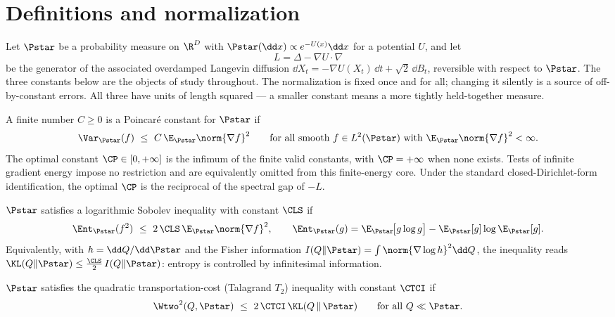 \documentclass[../main.tex]{subfiles}
\begin{document}
\section{Definitions and normalization}
\label{sec:def}

Let $\Pstar$ be a probability measure on $\R^D$ with $\Pstar(\dd x)\propto e^{-U(x)}\dd x$
for a potential $U$, and let
\[
  L=\Delta-\nabla U\cdot\nabla
\]
be the generator of the associated overdamped Langevin diffusion
$\dd X_t=-\nabla U(X_t)\,\dd t+\sqrt2\,\dd B_t$, reversible with respect to $\Pstar$. The
three constants below are the objects of study throughout. The normalization is fixed once
and for all; changing it silently is a source of off-by-constant errors. All three have
units of length squared --- a smaller constant means a more tightly held-together measure.

\begin{definition}
\label{def:poincare}
A finite number $C\ge0$ is a Poincar\'e constant for $\Pstar$ if
\begin{equation}\label{eq:poincare}
  \Var_{\Pstar}(f)\ \le\ C\,\E_{\Pstar}\norm{\nabla f}^2
  \qquad\text{for all smooth } f\in L^2(\Pstar)
  \text{ with }\E_{\Pstar}\norm{\nabla f}^2<\infty.
\end{equation}
The optimal constant $\CP\in[0,+\infty]$ is the infimum of the finite valid constants, with
$\CP=+\infty$ when none exists. Tests of infinite gradient energy impose no restriction and are
equivalently omitted from this finite-energy core. Under the standard closed-Dirichlet-form
identification, the optimal $\CP$ is the reciprocal of the spectral gap of $-L$.
\end{definition}

\begin{definition}
\label{def:lsi}
$\Pstar$ satisfies a logarithmic Sobolev inequality with constant $\CLS$ if
\begin{equation}\label{eq:lsi}
  \Ent_{\Pstar}(f^2)\ \le\ 2\,\CLS\,\E_{\Pstar}\norm{\nabla f}^2 ,
  \qquad
  \Ent_{\Pstar}(g)=\E_{\Pstar}\!\big[g\log g\big]-\E_{\Pstar}[g]\log\E_{\Pstar}[g].
\end{equation}
Equivalently, with $h=\dd Q/\dd\Pstar$ and the Fisher information
$I(Q\|\Pstar)=\int\norm{\nabla\log h}^2\dd Q$, the inequality reads
$\KL(Q\|\Pstar)\le\tfrac{\CLS}{2}\,I(Q\|\Pstar)$: entropy is controlled by infinitesimal
information.
\end{definition}

\begin{definition}
\label{def:tci}
$\Pstar$ satisfies the quadratic transportation-cost (Talagrand $T_2$) inequality with
constant $\CTCI$ if
\begin{equation}\label{eq:tci}
  \Wtwo^2(Q,\Pstar)\ \le\ 2\,\CTCI\,\KL(Q\,\|\,\Pstar)
  \qquad\text{for all } Q\ll\Pstar .
\end{equation}
\end{definition}
\end{document}
